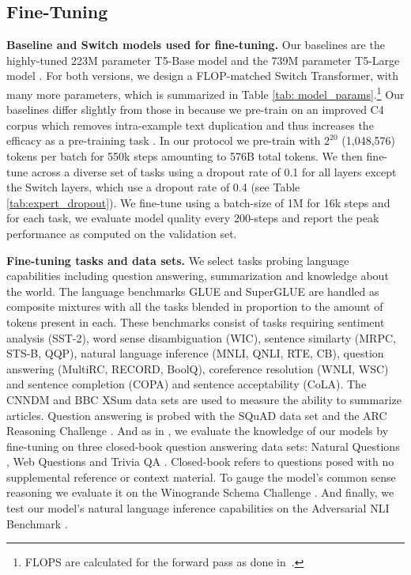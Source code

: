 \documentclass[twoside,11pt]{article}
\begin{document}
\subsection{Fine-Tuning}
\textbf{Baseline and Switch models used for fine-tuning.} 
Our baselines are the highly-tuned 223M parameter T5-Base model and the 739M parameter T5-Large model \citep{raffel2019exploring}.
For both versions, we design a FLOP-matched Switch Transformer, with many more parameters, which is summarized in Table \ref{tab: model_params}.\footnote{FLOPS are calculated for the forward pass as done in~\cite{kaplan2020scaling}.}
Our baselines differ slightly from those in \cite{raffel2019exploring} because we pre-train on an improved C4 corpus which removes intra-example text duplication and thus increases the efficacy as a pre-training task \cite{lee2021deduplicating}.
In our protocol we pre-train with $2^{20}$ (1,048,576) tokens per batch for 550k steps amounting to 576B total tokens.
We then fine-tune across a diverse set of tasks using a dropout rate of 0.1 for all layers except the Switch layers, which use a dropout rate of 0.4 (see Table \ref{tab:expert_dropout}).
We fine-tune using a batch-size of 1M for 16k steps and for each task, we evaluate model quality every 200-steps and report the peak performance as computed on the validation set.



\textbf{Fine-tuning tasks and data sets.} We select tasks probing language capabilities including question answering, summarization and knowledge about the world.
The language benchmarks GLUE \citep{wang2018glue} and SuperGLUE \citep{wang2019superglue} are handled as composite mixtures with all the tasks blended in proportion to the amount of tokens present in each.
These benchmarks consist of tasks requiring sentiment analysis (SST-2), word sense disambiguation (WIC), sentence similarty (MRPC, STS-B, QQP), natural language inference (MNLI, QNLI, RTE, CB), question answering (MultiRC, RECORD, BoolQ), coreference resolution (WNLI, WSC) and sentence completion (COPA) and sentence acceptability (CoLA).
The CNNDM \citep{cnn2015moritz} and BBC XSum \citep{narayan2018don} data sets are used to measure the ability to summarize articles.
Question answering is probed with the SQuAD data set \citep{rajpurkar2016squad} and the ARC Reasoning Challenge \citep{clark2018think}.
And as in \cite{roberts2020much}, we evaluate the knowledge of our models by fine-tuning on three closed-book question answering data sets:  Natural Questions \citep{kwiatkowski2019natural}, Web Questions \citep{berant2013semantic} and Trivia QA \citep{joshi2017triviaqa}. 
Closed-book refers to questions posed with no supplemental reference or context material. 
To gauge the model's common sense reasoning we evaluate it on the Winogrande Schema Challenge \citep{sakaguchi2020winogrande}.
And finally, we test our model's natural language inference capabilities on the Adversarial NLI Benchmark \citep{nie2019adversarial}.
\end{document}
